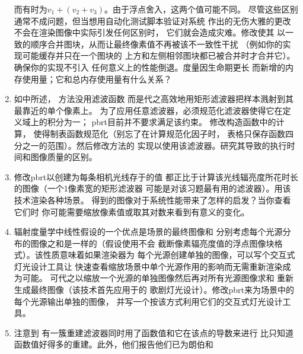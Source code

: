 \begin{enumerate}
            而有时为$v_1+(v_2+v_3)$。由于浮点舍入，这两个值可能不同。
            尽管这些区别通常不成问题，但当想用自动化测试脚本验证对系统
            作出的无伤大雅的更改不会在渲染图像中实际引发任何区别时，
            它们就会造成灾难。修改使其
            以一致的顺序合并图块，从而让最终像素值不再被该不一致性干扰
            （例如你的实现可能缓存并只在一个图块的
            上方和左侧相邻图块都已被合并时才合并它）。确保你的实现不引入
            任何意义上的性能倒退。度量因生命期更长
            而新增的内存使用量；它和总内存使用量有什么关系？
      \item \circletwo 如中所述，
            方法没用滤波函数
            而是代之高效地用矩形滤波器把样本溅射到其最靠近的单个像素上。
            为了应用任意滤波器，必须规范化滤波器使得它在定义域上的积分为一；
            pbrt目前并不要求满足该约束。
            修改构造函数中的计算，
            使得制表函数规范化（别忘了在计算规范化因子时，
            表格只保存函数四分之一的范围）。然后修改方法的
            实现以使用该滤波器。研究其导致的执行时间和图像质量的区别。
      \item \circleone 修改pbrt以创建为每条相机光线存于的值
            都正比于计算该光线辐亮度所花时长的图像（一个1像素宽的矩形滤波器
            可能是对该习题最有用的滤波器）。用该技术渲染各种场景。
            得到的图像对于系统性能带来了怎样的启发？当你查看它们时
            你可能需要缩放像素值或取其对数来看到有意义的变化。
      \item \circletwo 辐射度量学中线性假设的一个优点是场景的最终图像和
            分别考虑每个光源分布的图像之和是一样的（假设使用不会
            截断像素辐亮度值的浮点图像块格式）。该性质意味着如果渲染器为
            每个光源创建单独的图像，可以写个交互式灯光设计工具让
            快速查看缩放场景中单个光源作用的影响而无需重新渲染成为可能。
            可代之以缩放一个光源的单独图像然后再对所有光源图像求和
            重新生成最终图像（该技术首先应用于\citet{10.1145/122718.122723}的
            歌剧灯光设计）。修改pbrt来为场景中的每个光源输出单独的图像，
            并写一个按该方式利用它们的交互式灯光设计工具。
      \item \circlethree \citet{10.1145/54852.378514}注意到
            有一簇重建滤波器同时用了函数值和它在该点的导数来进行
            比只知道函数值好得多的重建。此外，他们报告他们已为朗伯和

\end{enumerate}
